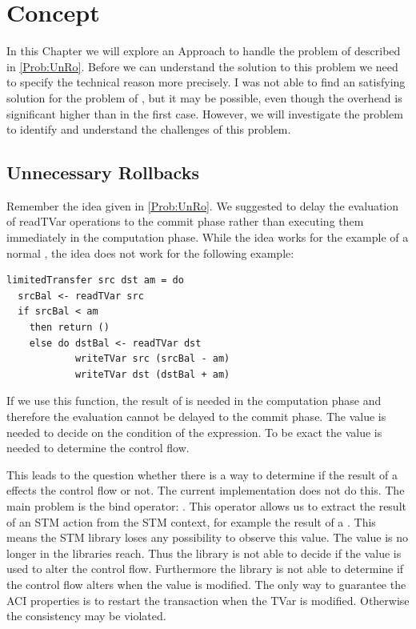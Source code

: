 
\chapter{Concept} %

\label{Chapter2} %

In this Chapter we will explore an Approach to handle the problem of  described in \ref{Prob:UnRo}.
Before we can understand the solution to this problem we need to specify the technical reason more precisely. 
I was not able to find an satisfying solution for the problem of , but it may 
be possible, even though the overhead is significant higher than in the first case. However, we will investigate 
the problem to identify and understand the challenges of this problem.

\section{Unnecessary Rollbacks}
Remember the idea given in \ref{Prob:UnRo}. We suggested to delay the evaluation of 
readTVar operations to the commit phase rather than executing them immediately in the computation
phase. While the idea works for the example of a normal , the idea does not work 
for the following example:
\begin{lstlisting}
limitedTransfer src dst am = do 
  srcBal <- readTVar src
  if srcBal < am
    then return ()
    else do dstBal <- readTVar dst
            writeTVar src (srcBal - am)
            writeTVar dst (dstBal + am)
\end{lstlisting}
If we use this function, the result of  is needed in the computation phase and therefore 
the evaluation cannot be delayed to the commit phase. The value is needed to decide on the condition of the 
 expression. To be exact the value is needed to determine the control flow. 

This leads to the question whether there is a way to determine if the result of a  effects the 
control flow or not. The current implementation does not do this. The main problem is the bind
operator: . This operator allows us to extract the result of an STM action 
from the STM context, for example the result of a . This means the STM library loses any possibility to 
observe this value. The value is no longer in the libraries reach. Thus the library is not able to decide if 
the value is used to alter the control flow. Furthermore the library is not able to determine if the control
flow alters when the value is modified. The only way to guarantee the ACI properties is to restart the 
transaction when the TVar is modified. Otherwise the consistency may be violated.

